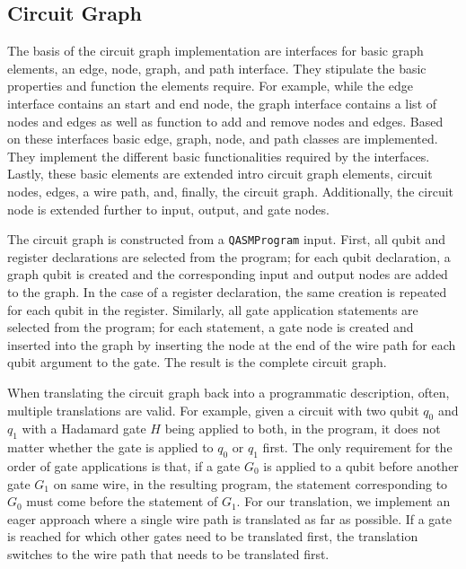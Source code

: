 \subsection{Circuit Graph}
The basis of the circuit graph implementation are interfaces for basic graph elements, \ie an edge, node, graph, and path interface. They stipulate the basic properties and function the elements require. For example, while the edge interface contains an start and end node, the graph interface contains a list of nodes and edges as well as function to add and remove nodes and edges. Based on these interfaces basic edge, graph, node, and path classes are implemented. They implement the different basic functionalities required by the interfaces. Lastly, these basic elements are extended intro circuit graph elements, circuit nodes, edges, a wire path, and, finally, the circuit graph. Additionally, the circuit node is extended further to input, output, and gate nodes.

The circuit graph is constructed from a \texttt{QASMProgram} input. First, all qubit and register declarations are selected from the program; for each qubit declaration, a graph qubit is created and the corresponding input and output nodes are added to the graph. In the case of a register declaration, the same creation is repeated for each qubit in the register. Similarly, all gate application statements are selected from the program; for each statement, a gate node is created and inserted into the graph by inserting the node at the end of the wire path for each qubit argument to the gate. The result is the complete circuit graph. 

When translating the circuit graph back into a programmatic description, often, multiple translations are valid. For example, given a circuit with two qubit $q_0$ and $q_1$ with a Hadamard gate $H$ being applied to both, in the program, it does not matter whether the gate is applied to $q_0$ or $q_1$ first. The only requirement for the order of gate applications is that, if a gate $G_0$ is applied to a qubit before another gate $G_1$ on same wire, in the resulting program, the statement corresponding to $G_0$ must come before the statement of $G_1$. For our translation, we implement an eager approach where a single wire path is translated as far as possible. If a gate is reached for which other gates need to be translated first, the translation switches to the wire path that needs to be translated first. 

